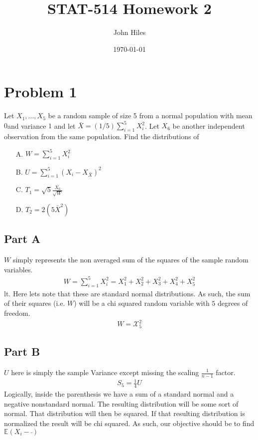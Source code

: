 \documentclass{article}
\title{STAT-514 Homework 2}
\author{John Hiles}
\date\today
\begin{document}
\maketitle %

\section*{Problem 1}
Let $X_1,...,X_5$ be a random sample of size 5 from a normal population with mean $0 $and variance $1$ and let $\bar{X}=(1/5)\sum_{i=1}^{5}X_i^2$. Let $X_6$ be another independent observation from the same population. Find the distributions of
\begin{enumerate}
\item[A.] $W=\sum_{i=1}^5 X_i^2$
\item[B.] $U=\sum_{i=1}^5 (X_i-X_{\bar{X}})^2$
\item[C.] $T_1 = \sqrt{5} \frac{X_6}{\sqrt{W}}$
\item[D.] $T_2 = 2(5\bar{X}^2)$

\end{enumerate}
\subsection*{Part A}
$W$ simply represents the non averaged sum of the squares of the sample random variables.
\begin{align*}
W=\sum_{i=1}^5 X_i^2 = X_1^2+X_2^2+X_3^2+X_4^2+X_5^2
\end{align*}lt.
Here lets note that these are standard normal distributions. As such, the sum of their squares (i.e. $W$) will be a chi squared random variable with $5$ degrees of freedom.
\begin{align*}
W = \mathcal{X}_5^2
\end{align*}
\subsection*{Part B}
$U$ here is simply the sample Variance except missing the scaling $\frac{1}{n-1}$ factor.
\begin{align*}
S_5 = \frac{1}{4} U
\end{align*}
Logically, inside the parenthesis we have a sum of a standard normal and a negative nonstandard normal. The resulting distribution will be some sort of normal. That distribution will then be squared. If that resulting distribution is normalized the result will be chi squared. As such, our objective should be to find $\mathbb{E}(X_i-\bar{})$
\end{document}
